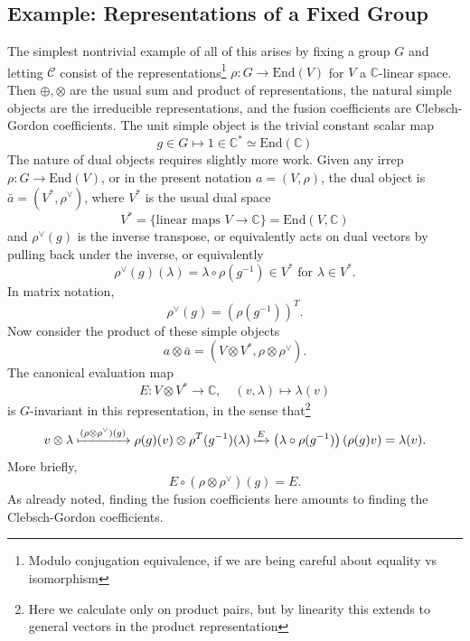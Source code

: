 \documentclass[11pt,letterpaper]{article}
\newcommand{\LP}{\left(}
\newcommand{\RP}{\right)}
\newcommand{\mc}[1]{\mathcal{#1}}
\newcommand{\C}{\mathbb{C}}
\begin{document}
\subsection{Example: Representations of a Fixed Group}
The simplest nontrivial example of all of this arises by fixing a group $G$ and letting $\mc{C}$ consist of the representations\footnote{Modulo conjugation equivalence, if we are being careful about equality vs isomorphism} $\rho: G \to \mbox{End}(V)$ for $V$ a $\C$-linear space. Then $\oplus, \otimes$ are the usual sum and product of representations, the natural simple objects are the irreducible representations, and the fusion coefficients are Clebsch-Gordon coefficients. The unit simple object is the trivial constant scalar map \begin{equation}
g \in G \mapsto 1 \in \C^* \simeq \mbox{End}(\C)
\end{equation}
The nature of dual objects requires slightly more work. Given any irrep $\rho: G \to \mbox{End}(V)$, or in the present notation $a = (V, \rho)$, the dual object is $\bar{a} = (V^*, \rho^\vee)$, where $V^*$ is the usual dual space \begin{equation}
V^* = \{\mbox{linear maps } V \to \C\} = \mbox{End}(V,\C)
\end{equation}
and $\rho^\vee(g)$ is the inverse transpose, or equivalently acts on dual vectors by pulling back under the inverse, or equivalently \begin{equation}
\rho^\vee(g) (\lambda) = \lambda \circ \rho(g^{-1}) \in V^* \mbox{ for } \lambda \in V^*.
\end{equation}
In matrix notation, \begin{equation}
\rho^\vee(g) = (\rho(g^{-1}))^T.
\end{equation}
Now consider the product of these simple objects \begin{equation}
a \otimes \bar{a} = (V \otimes V^*, \rho \otimes \rho^\vee).
\end{equation}
The canonical evaluation map \begin{equation}
E: V \otimes V^* \to \C, \quad (v, \lambda) \mapsto \lambda(v)
\end{equation}
is $G$-invariant in this representation, in the sense that\footnote{Here we calculate only on product pairs, but by linearity this extends to general vectors in the product representation} \begin{equation}
v \otimes \lambda \xmapsto{(\rho \otimes \rho^\vee)(g)} \rho(g)(v) \otimes \rho^T(g^{-1}) (\lambda) \xmapsto{E} \LP \lambda \circ \rho(g^{-1}) \RP (\rho(g) v) = \lambda(v).
\end{equation}
More briefly, \begin{equation}
E \circ (\rho \otimes \rho^\vee)(g) = E.
\end{equation}
As already noted, finding the fusion coefficients here amounts to finding the Clebsch-Gordon coefficients. 



\end{document}
